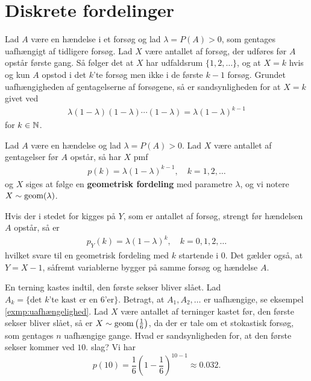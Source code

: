 \section{Diskrete fordelinger}
Lad $A$ være en hændelse i et forsøg og lad $\lambda = P(A) > 0$, som gentages uafhængigt af tidligere forsøg. Lad $X$ være antallet af forsøg, der udføres før $A$ opstår første gang. Så følger det at $X$ har udfaldsrum $\{1, 2, \ldots\}$, og at $X = k$ hvis og kun $A$ opstod i det $k$'te forsøg men ikke i de første $k - 1$ forsøg. Grundet uafhængigheden af gentagelserne af forsøgene, så er sandsynligheden for at $X = k$ givet ved
\begin{align*}
    \lambda(1-\lambda)(1-\lambda)\cdots (1-\lambda) =\lambda(1-\lambda)^{k-1}
\end{align*}
for $k \in \mathbb{N}$.
\begin{defn} \label{def:2.14} %
  Lad $A$ være en hændelse og lad $\lambda = P(A) > 0$. Lad $X$ være antallet af gentagelser før $A$ opstår, så har $X$ pmf
  \begin{align*}
    p(k)=\lambda(1-\lambda)^{k-1}, \quad k=1,2,\ldots 
  \end{align*}
  og $X$ siges at følge en \textbf{geometrisk fordeling} med parametre $\lambda$, og vi notere $X\sim\textnormal{geom}(\lambda)$.
\end{defn}

Hvis der i stedet for kigges på $Y$, som er antallet af forsøg, strengt før hændelsen $A$ opstår, så er
\begin{align*}
    p_{Y}(k)=\lambda(1-\lambda)^{k}, \quad k=0,1,2,\ldots
\end{align*}
hvilket svare til en geometrisk fordeling med $k$ startende i $0$. Det gælder også, at $Y=X-1$, såfremt variablerne bygger på samme forsøg og hændelse $A$.

\begin{exmp}
En terning kastes indtil, den første sekser bliver slået. Lad $A_k = \{\text{det } k \text{'te kast er en 6'er}\}$. Betragt, at $A_1, A_2, \ldots$ er uafhængige, se eksempel \ref{exmp:uafhængelighed}. Lad $X$ være antallet af terninger kastet før, den første sekser bliver slået, så er $X \sim \textnormal{geom}\left(\tfrac{1}{6}\right)$, da der er tale om et stokastisk forsøg, som gentages $n$ uafhængige gange. Hvad er sandsynligheden for, at den første sekser kommer ved $10.$ slag? Vi har 
\begin{equation*}
    p(10) = \frac{1}{6} \left(1-\frac{1}{6}\right)^{10 - 1} \approx 0.032.
\end{equation*}
\end{exmp}



